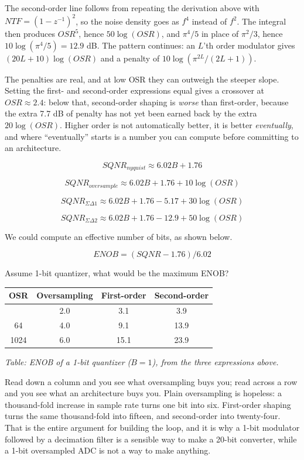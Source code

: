 The second-order line follows from repeating the derivation above with
\(NTF = (1-z^{-1})^2\), so the noise density goes as \(f^4\) instead of
\(f^2\). The integral then produces \(OSR^5\), hence \(50\log(OSR)\),
and \(\pi^4/5\) in place of \(\pi^2/3\), hence
\(10\log(\pi^4/5) = 12.9\) dB. The pattern continues: an \(L\)'th order
modulator gives \((20L+10)\log(OSR)\) and a penalty of
\(10\log(\pi^{2L}/(2L+1))\).

The penalties are real, and at low OSR they can outweigh the steeper
slope. Setting the first- and second-order expressions equal gives a
crossover at \(OSR \approx 2.4\): below that, second-order shaping is
\emph{worse} than first-order, because the extra 7.7 dB of penalty has
not yet been earned back by the extra \(20\log(OSR)\). Higher order is
not automatically better, it is better \emph{eventually}, and where
``eventually'' starts is a number you can compute before committing to
an architecture.

\[SQNR_{nyquist} \approx 6.02B + 1.76 \]

\[SQNR_{oversample} \approx 6.02B + 1.76 + 10 \log(OSR)\]

\[SQNR_{\Sigma\Delta 1} \approx 6.02 B + 1.76 - 5.17 + 30 \log(OSR)\]

\[SQNR_{\Sigma\Delta 2} \approx 6.02 B + 1.76 - 12.9 + 50 \log(OSR)\]

We could compute an effective number of bits, as shown below.

\[ ENOB = (SQNR - 1.76)/6.02 \]

Assume 1-bit quantizer, what would be the maximum ENOB?

\begin{longtable}[]{@{}cccc@{}}
\toprule\noalign{}
OSR & Oversampling & First-order & Second-order \\
\midrule\noalign{}
\endhead
\bottomrule\noalign{}
\endlastfoot
4 & 2.0 & 3.1 & 3.9 \\
64 & 4.0 & 9.1 & 13.9 \\
1024 & 6.0 & 15.1 & 23.9 \\
\end{longtable}

\emph{Table: ENOB of a 1-bit quantizer (\(B = 1\)), from the three
expressions above.}

Read down a column and you see what oversampling buys you; read across a
row and you see what an architecture buys you. Plain oversampling is
hopeless: a thousand-fold increase in sample rate turns one bit into
six. First-order shaping turns the same thousand-fold into fifteen, and
second-order into twenty-four. That is the entire argument for building
the loop, and it is why a 1-bit modulator followed by a decimation
filter is a sensible way to make a 20-bit converter, while a 1-bit
oversampled ADC is not a way to make anything.

